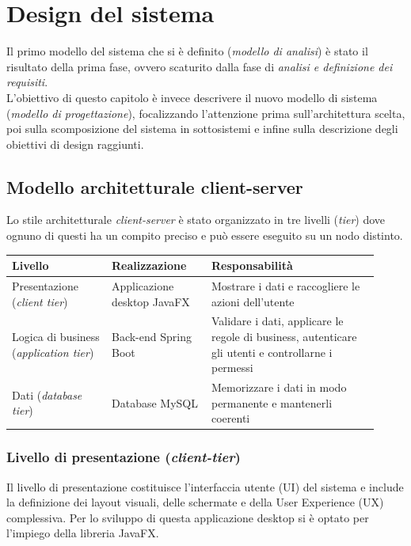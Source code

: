\chapter{Design del sistema} %

Il primo modello del sistema che si è definito (\textit{modello di analisi}) è stato il risultato della prima fase, ovvero scaturito dalla fase di \textit{analisi e definizione dei requisiti}. \\
\indent L’obiettivo di questo capitolo è invece descrivere il nuovo modello di sistema (\textit{modello di progettazione}), focalizzando l'attenzione prima sull'architettura scelta, poi sulla scomposizione del sistema in sottosistemi e infine sulla descrizione degli obiettivi di design raggiunti.

\section{Modello architetturale client-server}

Lo stile architetturale \textit{client-server} è stato organizzato in tre 
livelli (\textit{tier}) dove ognuno di questi ha un compito preciso e
può essere eseguito su un nodo distinto.

\begin{center}
\renewcommand{\arraystretch}{1.6}
\begin{tabular}{|p{0.25\linewidth}|p{0.25\linewidth}|p{0.42\linewidth}|}
\hline
\textbf{Livello} & \textbf{Realizzazione} & \textbf{Responsabilità} \\
\hline
Presentazione (\textit{client tier}) & Applicazione desktop JavaFX & Mostrare i dati e raccogliere le azioni dell'utente \\
\hline
Logica di business (\textit{application tier}) & Back-end Spring Boot & Validare i dati, applicare le regole di business, autenticare gli utenti e controllarne i permessi \\
\hline
Dati (\textit{database tier}) & Database MySQL & Memorizzare i dati in modo permanente e mantenerli coerenti \\
\hline
\end{tabular}
\end{center}

\subsection{Livello di presentazione (\textit{client-tier})}
Il livello di presentazione costituisce l'interfaccia utente (UI) del sistema e include 
la definizione dei layout visuali, delle schermate e della User Experience 
(UX) complessiva. Per lo sviluppo di questa applicazione desktop si è optato per 
l'impiego della libreria JavaFX.

